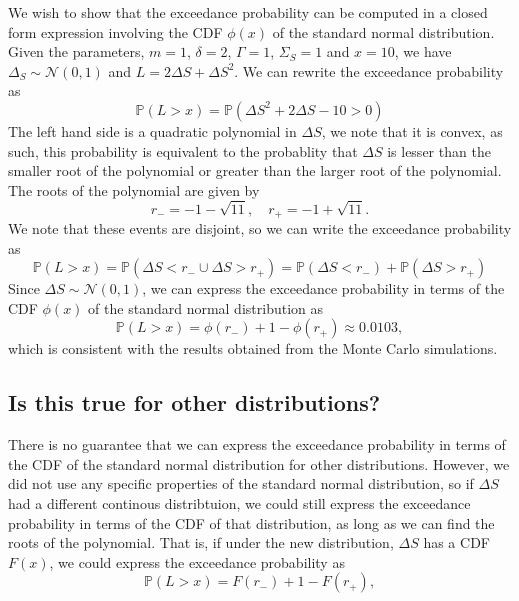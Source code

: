 \documentclass{article}
\begin{document}
We wish to show that the exceedance probability can be computed in a closed form expression involving the CDF $\phi(x)$ of the standard normal distribution. Given the parameters, $m = 1$, $\delta = 2$, $\Gamma = 1$, $\Sigma_S = 1$ and $x = 10$, we have $\Delta_S \sim \mathcal{N}(0, 1)$ and $L = 2\Delta S + \Delta S^2$. We can rewrite the exceedance probability as
\begin{equation}
    \mathbb{P}(L > x) = \mathbb{P}(\Delta S^2 + 2\Delta S - 10 > 0) 
\end{equation}
The left hand side is a quadratic polynomial in $\Delta S$, we note that it is convex, as such, this probability is equivalent to the probablity that $\Delta S $ is lesser than the smaller root of the polynomial or greater than the larger root of the polynomial. The roots of the polynomial are given by
\begin{equation*}
    r_{-} = -1 - \sqrt{11}, \quad r_{+} = -1 + \sqrt{11}.
\end{equation*}
We note that these events are disjoint, so we can write the exceedance probability as
\begin{equation}
    \mathbb{P}(L > x) = \mathbb{P}( \Delta S < r_{-} \cup \Delta S > r_{+}) = \mathbb{P}(\Delta S < r_{-}) + \mathbb{P}(\Delta S > r_{+})
\end{equation}
Since $\Delta S \sim \mathcal{N}(0, 1)$, we can express the exceedance probability in terms of the CDF $\phi(x)$ of the standard normal distribution as
\begin{equation}
    \mathbb{P}(L > x) = \phi(r_{-}) + 1 - \phi(r_{+})  \approx 0.0103,
\end{equation}
which is consistent with the results obtained from the Monte Carlo simulations.
\subsection{Is this true for other distributions?}
There is no guarantee that we can express the exceedance probability in terms of the CDF of the standard normal distribution for other distributions. However, we did not use any specific properties of the standard normal distribution, so if $\Delta S$ had a different continous distribtuion, we could still express the exceedance probability in terms of the CDF of that distribution, as long as we can find the roots of the polynomial. That is, if under the new distribution, $\Delta S$ has a CDF $F(x)$, we could express the exceedance probability as
\begin{equation*}
    \mathbb{P}(L > x) = F(r_{-}) + 1 - F(r_{+}),
\end{equation*}
\end{document}
